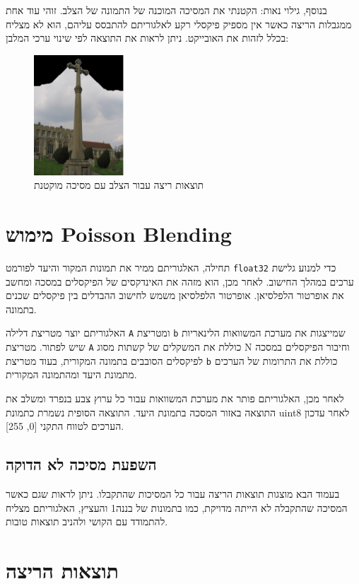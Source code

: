 \documentclass[a4paper,12pt]{article}
\begin{document}
בנוסף, גילוי נאות: הקטנתי את המסיכה המוכנה של התמונה של הצלב. זוהי עוד אחת ממגבלות הריצה כאשר אין מספיק פיקסלי רקע לאלגוריתם להתבסס עליהם, הוא לא מצליח בכלל לזהות את האובייקט. ניתן לראות את התוצאה לפי שינוי ערכי המלבן:
\begin{figure}[H]
    \centering
    \includegraphics[width=0.3\textwidth]{my_reasults/cross.png}
    \caption{תוצאות ריצה עבור הצלב עם מסיכה מוקטנת}
\end{figure}
\newpage
\section{מימוש Poisson Blending}


תחילה, האלגוריתם ממיר את תמונות המקור והיעד לפורמט \texttt{float32} כדי למנוע גלישת ערכים במהלך החישוב. לאחר מכן, הוא מזהה את האינדקסים של הפיקסלים במסכה ומחשב את אופרטור הלפלסיאן. אופרטור הלפלסיאן משמש לחישוב ההבדלים בין פיקסלים שכנים בתמונה.

האלגוריתם יוצר מטריצת דלילה \texttt{A} ומטריצת \texttt{b} שמייצגות את מערכת המשוואות הלינאריות שיש לפתור. מטריצת \texttt{A} כוללת את המשקלים של קשתות מסוג N וחיבור הפיקסלים במסכה לפיקסלים הסובבים בתמונה המקורית, בעוד מטריצת \texttt{b} כוללת את התרומות של הערכים מתמונת היעד ומהתמונה המקורית.

לאחר מכן, האלגוריתם פותר את מערכת המשוואות עבור כל ערוץ צבע בנפרד ומשלב את התוצאה באזור המסכה בתמונת היעד. התוצאה הסופית נשמרת כתמונת uint8 לאחר עדכון הערכים לטווח התקני 
[0, 255].
\subsection*{השפעת מסיכה לא הדוקה}

בעמוד הבא מוצגות תוצאות הריצה עבור כל המסיכות שהתקבלו. ניתן לראות שגם כאשר המסיכה שהתקבלה לא הייתה מדויקת, כמו בתמונות של בננה1 והעציץ, האלגוריתם מצליח להתמודד עם הקושי ולהניב תוצאות טובות.

\newpage
\section{תוצאות הריצה}
\end{document}
